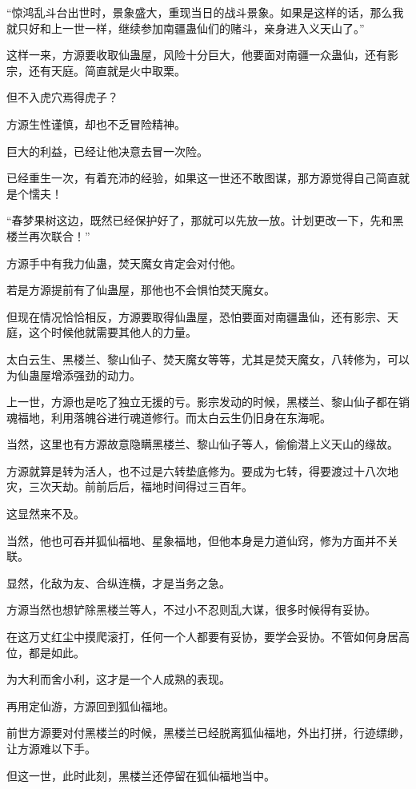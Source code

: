 \begin{this_body}
“惊鸿乱斗台出世时，景象盛大，重现当日的战斗景象。如果是这样的话，那么我就只好和上一世一样，继续参加南疆蛊仙们的赌斗，亲身进入义天山了。”

这样一来，方源要收取仙蛊屋，风险十分巨大，他要面对南疆一众蛊仙，还有影宗，还有天庭。简直就是火中取栗。

但不入虎穴焉得虎子？

方源生性谨慎，却也不乏冒险精神。

巨大的利益，已经让他决意去冒一次险。

已经重生一次，有着充沛的经验，如果这一世还不敢图谋，那方源觉得自己简直就是个懦夫！

“春梦果树这边，既然已经保护好了，那就可以先放一放。计划更改一下，先和黑楼兰再次联合！”

方源手中有我力仙蛊，焚天魔女肯定会对付他。

若是方源提前有了仙蛊屋，那他也不会惧怕焚天魔女。

但现在情况恰恰相反，方源要取得仙蛊屋，恐怕要面对南疆蛊仙，还有影宗、天庭，这个时候他就需要其他人的力量。

太白云生、黑楼兰、黎山仙子、焚天魔女等等，尤其是焚天魔女，八转修为，可以为仙蛊屋增添强劲的动力。

上一世，方源也是吃了独立无援的亏。影宗发动的时候，黑楼兰、黎山仙子都在销魂福地，利用落魄谷进行魂道修行。而太白云生仍旧身在东海呢。

当然，这里也有方源故意隐瞒黑楼兰、黎山仙子等人，偷偷潜上义天山的缘故。

方源就算是转为活人，也不过是六转垫底修为。要成为七转，得要渡过十八次地灾，三次天劫。前前后后，福地时间得过三百年。

这显然来不及。

当然，他也可吞并狐仙福地、星象福地，但他本身是力道仙窍，修为方面并不关联。

显然，化敌为友、合纵连横，才是当务之急。

方源当然也想铲除黑楼兰等人，不过小不忍则乱大谋，很多时候得有妥协。

在这万丈红尘中摸爬滚打，任何一个人都要有妥协，要学会妥协。不管如何身居高位，都是如此。

为大利而舍小利，这才是一个人成熟的表现。

再用定仙游，方源回到狐仙福地。

前世方源要对付黑楼兰的时候，黑楼兰已经脱离狐仙福地，外出打拼，行迹缥缈，让方源难以下手。

但这一世，此时此刻，黑楼兰还停留在狐仙福地当中。


\end{this_body}
